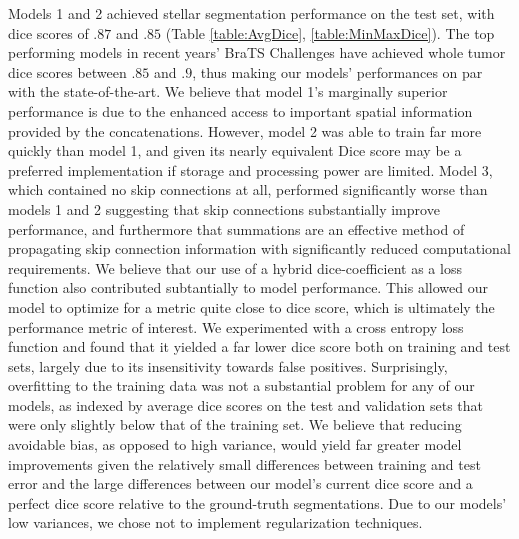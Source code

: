 \documentclass{article}
\begin{document}
    Models 1 and 2 achieved stellar segmentation performance on the test set, with dice scores of $.87$ and $.85$ (Table \ref{table:AvgDice}, \ref{table:MinMaxDice}). The top performing models in recent years' BraTS Challenges have achieved whole tumor dice scores between $.85$ and $.9$, thus making our models' performances on par with the state-of-the-art. We believe that model 1's marginally superior performance is due to the enhanced access to important spatial information provided by the concatenations. However, model 2 was able to train far more quickly than model 1, and given its nearly equivalent Dice score may be a preferred implementation if storage and processing power are limited. Model 3, which contained no skip connections at all, performed significantly worse than models 1 and 2 suggesting that skip connections substantially improve performance, and furthermore that summations are an effective method of propagating skip connection information with significantly reduced computational requirements.
   We believe that our use of a hybrid dice-coefficient as a loss function also contributed subtantially to model performance. This allowed our model to optimize for a metric quite close to dice score, which is ultimately the performance metric of interest. We experimented with a cross entropy loss function and found that it yielded a far lower dice score both on training and test sets, largely due to its insensitivity towards false positives. Surprisingly, overfitting to the training data was not a substantial problem for any of our models, as indexed by average dice scores on the test and validation sets that were only slightly below that of the training set. We believe that reducing avoidable bias, as opposed to high variance, would yield far greater model improvements given the relatively small differences between training and test error and the large differences between our model's current dice score and a perfect dice score relative to the ground-truth segmentations. Due to our models' low variances, we chose not to implement regularization techniques.
\end{document}
